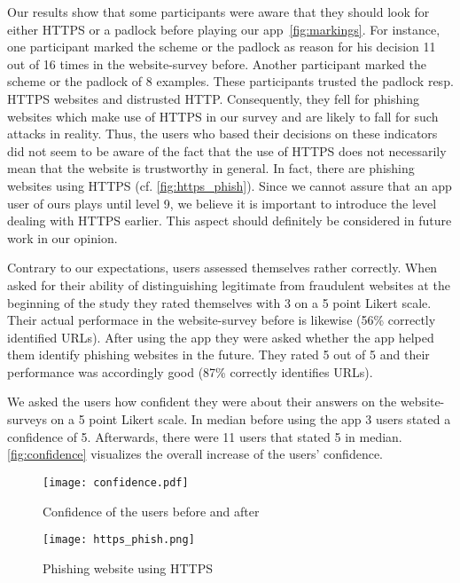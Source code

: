 \begin{description}[leftmargin=0cm]
	\item[HTTPS and Padlock:] Our results show that some participants were aware that they should look for either HTTPS or a padlock before playing our app~\autoref{fig:markings}.
	For instance, one participant marked the scheme or the padlock as reason for his decision 11 out of 16 times in the website-survey before. 
	Another participant marked the scheme or the padlock of 8 examples.
	These participants trusted the padlock resp. HTTPS websites and distrusted HTTP.
	Consequently, they fell for phishing websites which make use of HTTPS in our survey and are likely to fall for such attacks in reality.
	Thus, the users who based their decisions on these indicators did not seem to be aware of the fact that the use of HTTPS does not necessarily mean that the website is trustworthy in general.
	In fact, there are phishing websites using HTTPS (cf. \autoref{fig:https_phish}). 
	Since we cannot assure that an app user of ours plays until level 9, we believe it is important to introduce the level dealing with HTTPS earlier.
	This aspect should definitely be considered in future work in our opinion.
	\item[User Self-Assessment:] Contrary to our expectations, users assessed themselves rather correctly. When asked for their ability of distinguishing legitimate from fraudulent websites at the beginning of the study they rated themselves with 3 on a 5 point Likert scale.
Their actual performace in the website-survey before is likewise (56\% correctly identified URLs). After using the app they were asked whether the app helped them identify phishing websites in the future. They rated 5 out of 5 and their performance was accordingly good (87\% correctly identifies URLs).
	\item[Confidence:] We asked the users how confident they were about their answers on the website-surveys on a 5 point Likert scale. In median before using the app 3 users stated a confidence of 5. Afterwards, there were 11 users that stated 5 in median. \autoref{fig:confidence} visualizes the overall increase of the users' confidence.
	\begin{figure}
		\centering
		\texttt{[image: confidence.pdf]}
		\caption{Confidence of the users before and after}
		\label{fig:confidence}
		\end{figure}
\end{description}
\begin{figure}
	\centering
	\texttt{[image: https\_phish.png]}
	\caption{Phishing website using HTTPS~\cite{phishtank}}
	\label{fig:https_phish}
	\end{figure}
	
